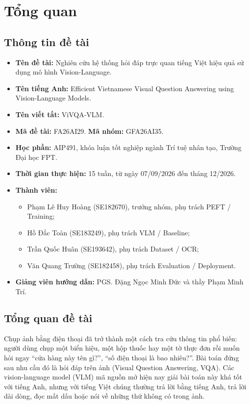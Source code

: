 \section{Tổng quan}
\label{sec:intro-overview}

\subsection{Thông tin đề tài}

\begin{itemize}
  \item \textbf{Tên đề tài:} Nghiên cứu hệ thống hỏi đáp trực quan tiếng Việt hiệu
  quả sử dụng mô hình Vision-Language.
  \item {\sloppy\textbf{Tên tiếng Anh:} Efficient Vietnamese Visual Question Answering
  using Vision-Language Models.\par}
  \item \textbf{Tên viết tắt:} ViVQA-VLM.
  \item \textbf{Mã đề tài:} FA26AI29. \textbf{Mã nhóm:} GFA26AI35.
  \item \textbf{Học phần:} AIP491, khóa luận tốt nghiệp ngành Trí tuệ nhân tạo,
  Trường Đại học FPT.
  \item \textbf{Thời gian thực hiện:} 15 tuần, từ ngày 07/09/2026 đến tháng
  12/2026.
  \item \textbf{Thành viên:}
  \begin{itemize}
    \item Phạm Lê Huy Hoàng (SE182670), trưởng nhóm, phụ trách PEFT / Training;
    \item Hồ Đắc Toàn (SE183249), phụ trách VLM / Baseline;
    \item Trần Quốc Huân (SE193642), phụ trách Dataset / OCR;
    \item Văn Quang Trường (SE182458), phụ trách Evaluation / Deployment.
  \end{itemize}
  \item \textbf{Giảng viên hướng dẫn:} PGS. Đặng Ngọc Minh Đức và thầy Phạm Minh
  Trí.
\end{itemize}

\subsection{Tổng quan đề tài}

Chụp ảnh bằng điện thoại đã trở thành một cách tra cứu thông tin phổ biến: người
dùng chụp một biển hiệu, một hộp thuốc hay một tờ thực đơn rồi muốn hỏi ngay
``cửa hàng này tên gì?'', ``số điện thoại là bao nhiêu?''. Bài toán đứng sau nhu
cầu đó là hỏi đáp trên ảnh (Visual Question Answering, VQA). Các vision-language
model (VLM) mã nguồn mở hiện nay giải bài toán này khá tốt với tiếng Anh, nhưng
với tiếng Việt chúng thường trả lời bằng tiếng Anh, trả lời dài dòng, đọc mất dấu
hoặc nói về những thứ không có trong ảnh.

